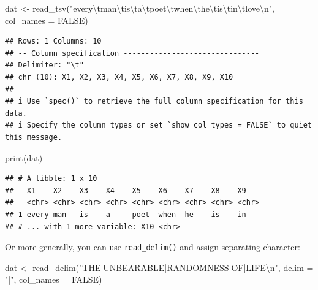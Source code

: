 \documentclass[
  12pt,
]{krantz}
\makeatletter
\newenvironment{Shaded}{\begin{snugshade}}{\end{snugshade}}
\newcommand{\AttributeTok}[1]{\textcolor[rgb]{0.61,0.61,0.61}{#1}}
\newcommand{\ConstantTok}[1]{\textcolor[rgb]{0,0,0}{#1}}
\newcommand{\FunctionTok}[1]{\textcolor[rgb]{0,0,0}{#1}}
\newcommand{\NormalTok}[1]{#1}
\newcommand{\OtherTok}[1]{\textcolor[rgb]{0.37,0.37,0.37}{#1}}
\newcommand{\SpecialCharTok}[1]{\textcolor[rgb]{0,0,0}{#1}}
\newcommand{\StringTok}[1]{\textcolor[rgb]{0.5,0.5,0.5}{#1}}
\newenvironment{kframe}{%
\medskip{}
\setlength{\fboxsep}{.8em}
 \def\at@end@of@kframe{}%
 \ifinner\ifhmode%
  \def\at@end@of@kframe{\end{minipage}}%
  \begin{minipage}{\columnwidth}%
 \fi\fi%
 \def\FrameCommand##1{\hskip\@totalleftmargin \hskip-\fboxsep
 \colorbox{shadecolor}{##1}\hskip-\fboxsep
     \hskip-\linewidth \hskip-\@totalleftmargin \hskip\columnwidth}%
 \MakeFramed {\advance\hsize-\width
   \@totalleftmargin\z@ \linewidth\hsize
   \@setminipage}}%
 {\par\unskip\endMakeFramed%
 \at@end@of@kframe}
\renewenvironment{Shaded}{\begin{kframe}}{\end{kframe}}
\makeatother
\begin{document}
\begin{Shaded}
\begin{Highlighting}[]
\NormalTok{dat }\OtherTok{\textless{}{-}} \FunctionTok{read\_tsv}\NormalTok{(}\StringTok{"every}\SpecialCharTok{\textbackslash{}t}\StringTok{man}\SpecialCharTok{\textbackslash{}t}\StringTok{is}\SpecialCharTok{\textbackslash{}t}\StringTok{a}\SpecialCharTok{\textbackslash{}t}\StringTok{poet}\SpecialCharTok{\textbackslash{}t}\StringTok{when}\SpecialCharTok{\textbackslash{}t}\StringTok{he}\SpecialCharTok{\textbackslash{}t}\StringTok{is}\SpecialCharTok{\textbackslash{}t}\StringTok{in}\SpecialCharTok{\textbackslash{}t}\StringTok{love}\SpecialCharTok{\textbackslash{}n}\StringTok{"}\NormalTok{, }
    \AttributeTok{col\_names =} \ConstantTok{FALSE}\NormalTok{)}
\end{Highlighting}
\end{Shaded}

\begin{verbatim}
## Rows: 1 Columns: 10
## -- Column specification -------------------------------
## Delimiter: "\t"
## chr (10): X1, X2, X3, X4, X5, X6, X7, X8, X9, X10
## 
## i Use `spec()` to retrieve the full column specification for this data.
## i Specify the column types or set `show_col_types = FALSE` to quiet this message.
\end{verbatim}

\begin{Shaded}
\begin{Highlighting}[]
\FunctionTok{print}\NormalTok{(dat)}
\end{Highlighting}
\end{Shaded}

\begin{verbatim}
## # A tibble: 1 x 10
##   X1    X2    X3    X4    X5    X6    X7    X8    X9   
##   <chr> <chr> <chr> <chr> <chr> <chr> <chr> <chr> <chr>
## 1 every man   is    a     poet  when  he    is    in   
## # ... with 1 more variable: X10 <chr>
\end{verbatim}

Or more generally, you can use \texttt{read\_delim()} and assign separating character:

\begin{Shaded}
\begin{Highlighting}[]
\NormalTok{dat }\OtherTok{\textless{}{-}} \FunctionTok{read\_delim}\NormalTok{(}\StringTok{"THE|UNBEARABLE|RANDOMNESS|OF|LIFE}\SpecialCharTok{\textbackslash{}n}\StringTok{"}\NormalTok{, }
    \AttributeTok{delim =} \StringTok{"|"}\NormalTok{, }\AttributeTok{col\_names =} \ConstantTok{FALSE}\NormalTok{)}
\end{Highlighting}
\end{Shaded}
\end{document}
